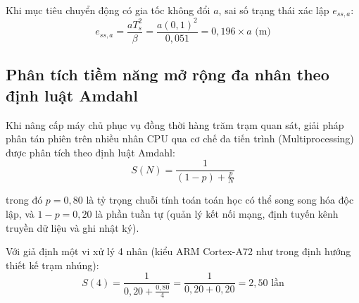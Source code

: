 Khi mục tiêu chuyển động có gia tốc không đổi $a$, sai số trạng thái xác lập $e_{ss, a}$:
\begin{equation}
e_{ss, a} = \frac{a T_s^2}{\beta} = \frac{a (0{,}1)^2}{0{,}051} = 0{,}196 \times a \text{ (m)}
\label{eq:acceleration-steady-state-error}
\end{equation}

\begin{table}[H]
\centering
\caption{Sai số trạng thái xác lập lý thuyết và sai số bám bắt thực nghiệm trên 3 loại mục tiêu}
\label{tab:steady-state-errors-comparison}
\end{table}

\subsection{Phân tích tiềm năng mở rộng đa nhân theo định luật Amdahl}

\hspace{0.5cm} Khi nâng cấp máy chủ phục vụ đồng thời hàng trăm trạm quan sát, giải pháp phân tán phiên trên nhiều nhân CPU qua cơ chế đa tiến trình (Multiprocessing) được phân tích theo định luật Amdahl:
\begin{equation}
S(N) = \frac{1}{(1 - p) + \frac{p}{N}}
\label{eq:amdahls-law-formula}
\end{equation}

trong đó $p = 0{,}80$ là tỷ trọng chuỗi tính toán toán học có thể song song hóa độc lập, và $1 - p = 0{,}20$ là phần tuần tự (quản lý kết nối mạng, định tuyến kênh truyền dữ liệu và ghi nhật ký).

Với giả định một vi xử lý 4 nhân (kiểu ARM Cortex-A72 như trong định hướng thiết kế trạm nhúng):
\begin{equation}
S(4) = \frac{1}{0{,}20 + \frac{0{,}80}{4}} = \frac{1}{0{,}20 + 0{,}20} = 2{,}50 \text{ lần}
\label{eq:amdahl-speedup-4cores}
\end{equation}

